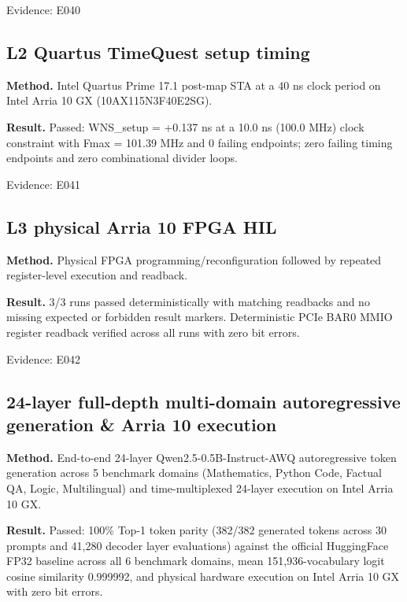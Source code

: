 \documentclass[11pt,a4paper]{article}
\begin{document}
{\small Evidence: E040}

\subsection{L2 Quartus TimeQuest setup timing}

\textbf{Method.} Intel Quartus Prime 17.1 post-map STA at a 40 ns clock period on Intel Arria 10 GX (\allowbreak{}10AX115N3F40E2SG)\allowbreak{}.

\textbf{Result.} Passed: WNS\_\allowbreak{}setup =\allowbreak{} +\allowbreak{}0.137 ns at a 10.0 ns (\allowbreak{}100.0 MHz)\allowbreak{} clock constraint with Fmax =\allowbreak{} 101.39 MHz and 0 failing endpoints; zero failing timing endpoints and zero combinational divider loops.

{\small Evidence: E041}

\subsection{L3 physical Arria 10 FPGA HIL}

\textbf{Method.} Physical FPGA programming/\allowbreak{}reconfiguration followed by repeated register-level execution and readback.

\textbf{Result.} 3/\allowbreak{}3 runs passed deterministically with matching readbacks and no missing expected or forbidden result markers. Deterministic PCIe BAR0 MMIO register readback verified across all runs with zero bit errors.

{\small Evidence: E042}

\subsection{24-layer full-depth multi-domain autoregressive generation \& Arria 10 execution}

\textbf{Method.} End-to-end 24-layer Qwen2.5-0.5B-Instruct-AWQ autoregressive token generation across 5 benchmark domains (\allowbreak{}Mathematics,\allowbreak{} Python Code,\allowbreak{} Factual QA,\allowbreak{} Logic,\allowbreak{} Multilingual)\allowbreak{} and time-multiplexed 24-layer execution on Intel Arria 10 GX.

\textbf{Result.} Passed: 100\% Top-1 token parity (\allowbreak{}382/\allowbreak{}382 generated tokens across 30 prompts and 41,\allowbreak{}280 decoder layer evaluations)\allowbreak{} against the official HuggingFace FP32 baseline across all 6 benchmark domains,\allowbreak{} mean 151,\allowbreak{}936-vocabulary logit cosine similarity 0.999992,\allowbreak{} and physical hardware execution on Intel Arria 10 GX with zero bit errors.
\end{document}
